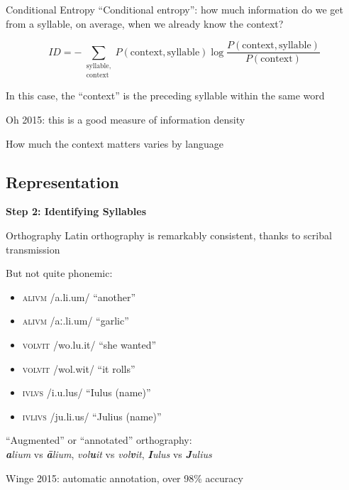 \documentclass{beamer}
\DeclareRobustCommand\ipa[1]{{\ipafamily/#1/}}
\begin{document}
\begin{frame}{Conditional Entropy}
``Conditional entropy'': how much information do we get from a syllable, on average, when we already know the context?

\[ID = - \sum_{\substack{\textrm{syllable},\\\textrm{context}}} P(\textrm{context}, \textrm{syllable}) \log \frac{P(\textrm{context}, \textrm{syllable})}{P(\textrm{context})}\]

In this case, the ``context'' is the preceding syllable within the same word

Oh 2015: this is a good measure of information density

How much the context matters varies by language
\end{frame}

\subsection{Representation}

\begin{frame}{}
\begin{center}
\textbf{\Large Step 2: Identifying Syllables}
\end{center}
\end{frame}

\begin{frame}{Orthography}
Latin orthography is remarkably consistent, thanks to scribal transmission

But not quite phonemic:
\vspace{-1em}
\begin{itemize}
    \item \textsc{alivm} \ipa{a.li.um} ``another''
    \item \textsc{alivm} \ipa{aː.li.um} ``garlic''
    \item \textsc{volvit} \ipa{wo.lu.it} ``she wanted''
    \item \textsc{volvit} \ipa{wol.wit} ``it rolls''
    \item \textsc{ivlvs} \ipa{i.u.lus} ``Iulus (name)''
    \item \textsc{ivlivs} \ipa{ju.li.us} ``Julius (name)''
\end{itemize}

``Augmented'' or ``annotated'' orthography:\\
\quad\emph{\textbf{a}lium} vs \emph{\textbf{ā}lium}, \emph{vol\textbf{u}it} vs \emph{vol\textbf{v}it}, \emph{\textbf{I}ulus} vs \emph{\textbf{J}ulius}

Winge 2015: automatic annotation, over 98\% accuracy
\end{frame}
\end{document}
